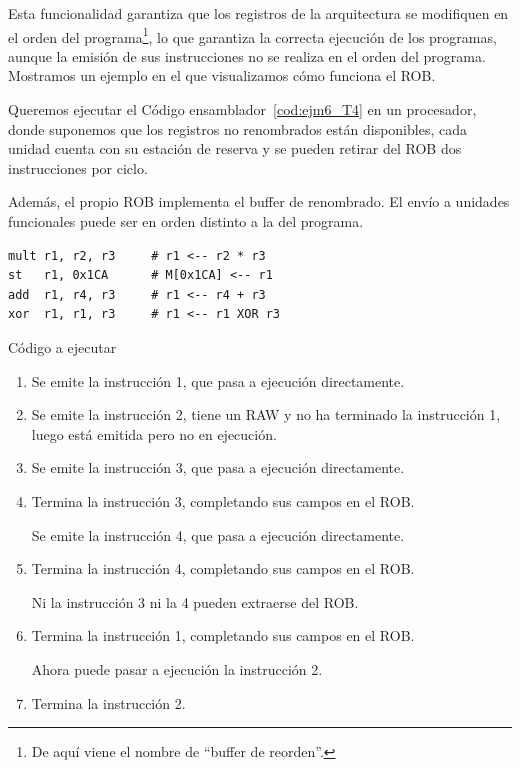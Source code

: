 Esta funcionalidad garantiza que los registros de la arquitectura se modifiquen en el orden del programa\footnote{De aquí viene el nombre de ``buffer de reorden''.}, lo que garantiza la correcta ejecución de los programas, aunque la emisión de sus instrucciones no se realiza en el orden del programa.\\

Mostramos un ejemplo en el que visualizamos cómo funciona el ROB.

\begin{ejemplo}
    Queremos ejecutar el Código ensamblador~\ref{cod:ejm6_T4} en un procesador, donde suponemos que los registros no renombrados están disponibles, cada unidad cuenta con su estación de reserva y se pueden retirar del ROB dos instrucciones por ciclo.

    Además, el propio ROB implementa el buffer de renombrado. El envío a unidades funcionales puede ser en orden distinto a la del programa.
    \begin{listing}[H]
    \begin{verbatim}
mult r1, r2, r3     # r1 <-- r2 * r3
st   r1, 0x1CA      # M[0x1CA] <-- r1
add  r1, r4, r3     # r1 <-- r4 + r3
xor  r1, r1, r3     # r1 <-- r1 XOR r3
    \end{verbatim}
    \caption{Código a ejecutar}
    \label{cod:ejm6_T4}
    \end{listing}

    \begin{enumerate}
        \item Se emite la instrucción 1, que pasa a ejecución directamente.
        \item Se emite la instrucción 2, tiene un RAW y no ha terminado la instrucción 1, luego está emitida pero no en ejecución.
        \item Se emite la instrucción 3, que pasa a ejecución directamente.
        \item Termina la instrucción 3, completando sus campos en el ROB. 

            Se emite la instrucción 4, que pasa a ejecución directamente.
        \item Termina la instrucción 4, completando sus campos en el ROB.

            Ni la instrucción 3 ni la 4 pueden extraerse del ROB.
        \item Termina la instrucción 1, completando sus campos en el ROB.

            Ahora puede pasar a ejecución la instrucción 2.
        \item Termina la instrucción 2.


\end{enumerate}
\end{ejemplo}
